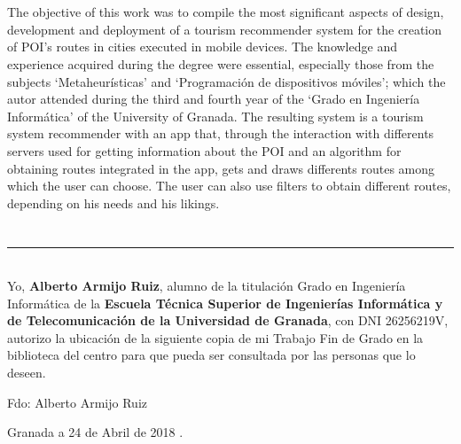 \\

\vspace{0.7cm}
\\
The objective of this work was to compile the most significant aspects of design, development and deployment of a tourism recommender system for the creation of POI's routes in cities executed in mobile devices.\newline
The knowledge and experience acquired during the degree were essential, especially those from the subjects \enquote*{Metaheurísticas} and \enquote*{Programación de dispositivos móviles}; which the autor attended during the third and fourth year of the \enquote*{Grado en Ingeniería Informática} of the University of Granada.\newline
The resulting system is a tourism system recommender with an app that, through the interaction with differents servers used for getting information about the POI and an algorithm for obtaining routes integrated in the app, gets and draws differents routes among which the user can choose. The user can also use filters to obtain different routes, depending on his needs and his likings.

\chapter*{}
\thispagestyle{empty}

\noindent\rule[-1ex]{\textwidth}{2pt}\\[4.5ex]

Yo, \textbf{Alberto Armijo Ruiz}, alumno de la titulación Grado en Ingeniería Informática de la \textbf{Escuela Técnica Superior
de Ingenierías Informática y de Telecomunicación de la Universidad de Granada}, con DNI 26256219V, autorizo la
ubicación de la siguiente copia de mi Trabajo Fin de Grado en la biblioteca del centro para que pueda ser
consultada por las personas que lo deseen.

\vspace{6cm}

\noindent Fdo: Alberto Armijo Ruiz

\vspace{2cm}

\begin{flushright}
Granada a 24 de Abril de 2018 .
\end{flushright}


